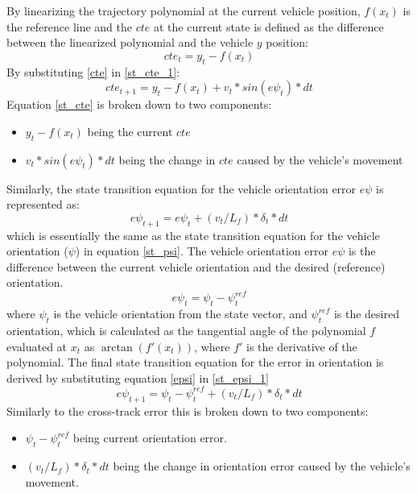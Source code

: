 By linearizing the trajectory polynomial at the current vehicle position, \(f(x_t)\) is the reference line and the \(cte\) at the current state is defined as the difference between the linearized polynomial and the vehicle \(y\) position:
\begin{equation}
cte_t = y_t - f(x_t)
\label{cte}
\end{equation}
By substituting \eqref{cte} in \eqref{st_cte_1}:
\begin{equation}
cte_{t+1} = y_t - f(x_t) + v_t* sin(e\psi_t) * dt
\label{st_cte}
\end{equation}
Equation \eqref{st_cte} is broken down to two components:
\begin{itemize}
\item \(y_t - f(x_t)\) being the current \(cte\)
\item \(v_t* sin(e\psi_t) * dt\) being the change in \(cte\) caused by the vehicle's movement
\end{itemize}
Similarly, the state transition equation for the vehicle orientation error \(e\psi\) is represented as:
\begin{equation}
e\psi_{t+1} = e\psi_t + (v_t/L_f) * \delta_t * dt
\label{st_epsi_1}
\end{equation}
which is essentially the same as the state transition equation for the vehicle orientation (\(\psi\)) in equation \eqref{st_psi}.
The vehicle orientation error \(e\psi\) is the difference between the current vehicle orientation and the desired (reference) orientation.
\begin{equation}
e\psi_t = \psi_t - \psi^{ref}_t
\label{epsi}
\end{equation}
where \(\psi_t\) is the vehicle orientation from the state vector, and \(\psi^{ref}_t\) is the desired orientation, which is calculated as the tangential angle of the polynomial \(f\) evaluated at \(x_t\) as \(\arctan(f'(x_t))\), where \(f'\) is the derivative of the polynomial. The final state transition equation for the error in orientation is derived by substituting equation \eqref{epsi} in \eqref{st_epsi_1}
\begin{equation}
e\psi_{t+1} = \psi_t - \psi^{ref}_t + (v_t/L_f) * \delta_t * dt
\label{st_epsi}
\end{equation}
Similarly to the cross-track error this is broken down to two components:
\begin{itemize}
\item \(\psi_t - \psi^{ref}_t\) being current orientation error.
\item \((v_t/L_f) * \delta_t * dt\) being the change in orientation error caused by the vehicle's movement.
\end{itemize}

